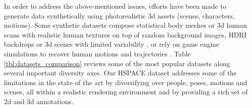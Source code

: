 \documentclass[10pt,twocolumn,letterpaper]{article}
\begin{document}
In order to address the above-mentioned issues, efforts have been made to generate data synthetically using photorealistic 3d assets (scenes, characters, motions). Some synthetic datasets compose statistical body meshes or 3d human scans with realistic human textures on top of random background images, HDRI backdrops or 3d scenes with limited variability \cite{varol2017learning, yan2021ultrapose, Patel:CVPR:2021, zhu2020simpose}, or rely on game engine simulations to recover human motions and trajectories \cite{caoHMP2020}. Table \ref{tbl:datasets_comparison} reviews some of the most popular datasets along several important diversity axes.
Our HSPACE dataset addresses some of the limitations in the state of the art by diversifying over people, poses, motions and scenes, all within a realistic rendering environment and by providing a rich set of 2d and 3d annotations. 
\end{document}
